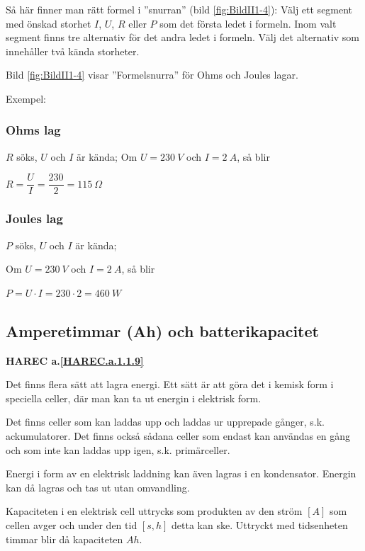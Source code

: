 Så här finner man rätt formel i ''snurran'' (bild \ref{fig:BildII1-4}):
Välj ett segment med önskad storhet \(I\), \(U\), \(R\) eller \(P\) som det
första ledet i formeln.
Inom valt segment finns tre alternativ för det andra ledet i formeln.
Välj det alternativ som innehåller två kända storheter.

Bild \ref{fig:BildII1-4} visar ''Formelsnurra'' för Ohms och Joules lagar.

Exempel:

\subsubsection{Ohms lag}

\(R\) söks, \(U\) och \(I\) är kända;
Om \(U = 230\ V\) och \(I = 2\ A\), så blir

\(R=\dfrac{U}{I}=\dfrac{230}{2}=115\ \Omega\)

\subsubsection{Joules lag}

\(P\) söks, \(U\) och \(I\) är kända;

Om \(U = 230\ V\) och \(I = 2\ A\), så blir

\(P = U \cdot I = 230 \cdot 2 = 460\ W\)

\subsection{Amperetimmar (Ah) och batterikapacitet}
\textbf{HAREC a.\ref{HAREC.a.1.1.9}\label{myHAREC.a.1.1.9}}

Det finns flera sätt att lagra energi.
Ett sätt är att göra det i kemisk form i speciella celler, där man kan ta ut
energin i elektrisk form.

Det finns celler som kan laddas upp och laddas ur upprepade gånger, s.k.
ackumulatorer.
Det finns också sådana celler som endast kan användas en gång och som inte
kan laddas upp igen, s.k. primärceller.

Energi i form av en elektrisk laddning kan även lagras i en kondensator.
Energin kan då lagras och tas ut utan omvandling.

Kapaciteten i en elektrisk cell uttrycks som produkten av den ström \([A]\) som
cellen avger och under den tid \([s, h]\) detta kan ske.
Uttryckt med tidsenheten timmar blir då kapaciteten \(Ah\).

